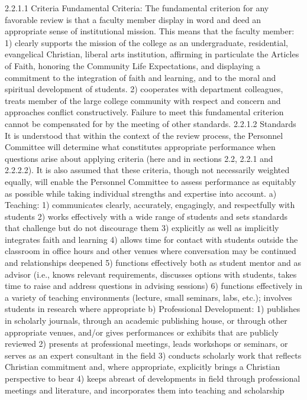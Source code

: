 \documentclass[letterpaper, 11pt]{article}
\begin{document}
	2.2.1.1 Criteria
	Fundamental Criteria: The fundamental criterion for any favorable review is that a faculty member display in word and deed an appropriate sense of institutional mission. This means that the faculty member:
	1) clearly supports the mission of the college as an undergraduate, residential, evangelical Christian, liberal arts institution, affirming in particulate the Articles of Faith, honoring the Community Life Expectations, and displaying a commitment to the integration of faith and learning, and to the moral and spiritual development of students.
	2) cooperates with department colleagues, treats member of the large college community with respect and concern and approaches conflict constructively.
	Failure to meet this fundamental criterion cannot be compensated for by the meeting of other standards.
	2.2.1.2 Standards
	It is understood that within the context of the review process, the Personnel Committee will determine what constitutes appropriate performance when questions arise about applying criteria (here and in sections 2.2, 2.2.1 and 2.2.2.2).  It is also assumed that these criteria, though not necessarily weighted equally, will enable the Personnel Committee to assess performance as equitably as possible while taking individual strengths and expertise into account.
	a) Teaching:
	1) communicates clearly, accurately, engagingly, and respectfully with students
	2) works effectively with a wide range of students and sets standards that challenge but do not discourage them
	3) explicitly as well as implicitly integrates faith and learning
	4) allows time for contact with students outside the classroom in office hours and other venues where conversation may be continued and relationships deepened
	5) functions effectively both as student mentor and as advisor (i.e., knows relevant requirements, discusses options with students, takes time to raise and address questions in advising sessions)
	6) functions effectively in a variety of teaching environments (lecture, small seminars, labs, etc.); involves students in research where appropriate
	b) Professional Development:
	1) publishes in scholarly journals, through an academic publishing house, or through other appropriate venues, and/or gives performances or exhibits that are publicly reviewed
	2) presents at professional meetings, leads workshops or seminars, or serves as an expert consultant in the field
	3) conducts scholarly work that reflects Christian commitment and, where appropriate, explicitly brings a Christian perspective to bear
	4) keeps abreast of developments in field through professional meetings and literature, and incorporates them into teaching and scholarship
\end{document}
